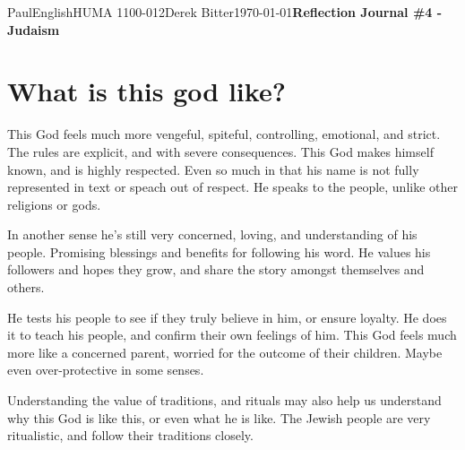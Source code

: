 \documentclass[12pt,letterpaper]{article}
\begin{document}
\begin{mla}{Paul}{English}{HUMA 1100-012}{Derek Bitter}{\today}{\textbf{Reflection Journal \#4 - Judaism}}

\section{What is this god like?}







This God feels much more vengeful, spiteful, controlling, emotional,
and strict. The rules are explicit, and with severe consequences. This
God makes himself known, and is highly respected. Even so much in that
his name is not fully represented in text or speach out of respect. He
speaks to the people, unlike other religions or gods.

In another sense he's still very concerned, loving, and understanding
of his people. Promising blessings and benefits for following his
word. He values his followers and hopes they grow, and share the story
amongst themselves and others.

He tests his people to see if they truly believe in him, or ensure
loyalty. He does it to teach his people, and confirm their own
feelings of him. This God feels much more like a concerned parent,
worried for the outcome of their children. Maybe even over-protective
in some senses.

Understanding the value of traditions, and rituals may also help us
understand why this God is like this, or even what he is like. The
Jewish people are very ritualistic, and follow their traditions
closely.



\end{mla}
\end{document}
